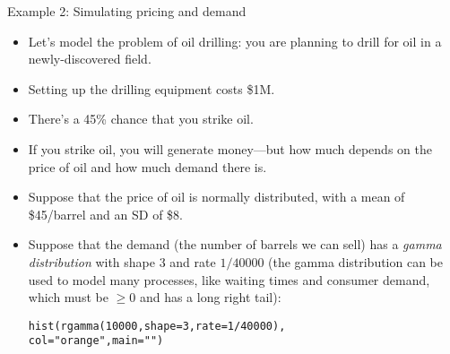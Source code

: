 \documentclass{beamer}\usepackage[]{graphicx}\usepackage[]{color}
\makeatletter
\newcommand{\hlnum}[1]{\textcolor[rgb]{0.824,0.412,0.118}{#1}}%
\newcommand{\hlstr}[1]{\textcolor[rgb]{1,0.894,0.71}{#1}}%
\newcommand{\hlopt}[1]{\textcolor[rgb]{1,0.894,0.769}{#1}}%
\newcommand{\hlstd}[1]{\textcolor[rgb]{1,0.894,0.769}{#1}}%
\newcommand{\hlkwc}[1]{\textcolor[rgb]{0.78,0.941,0.545}{#1}}%
\newcommand{\hlkwd}[1]{\textcolor[rgb]{1,0.78,0.769}{#1}}%
\newenvironment{kframe}{%
 \def\at@end@of@kframe{}%
 \ifinner\ifhmode%
  \def\at@end@of@kframe{\end{minipage}}%
  \begin{minipage}{\columnwidth}%
 \fi\fi%
 \def\FrameCommand##1{\hskip\@totalleftmargin \hskip-\fboxsep
 \colorbox{shadecolor}{##1}\hskip-\fboxsep
     \hskip-\linewidth \hskip-\@totalleftmargin \hskip\columnwidth}%
 \MakeFramed {\advance\hsize-\width
   \@totalleftmargin\z@ \linewidth\hsize
   \@setminipage}}%
 {\par\unskip\endMakeFramed%
 \at@end@of@kframe}
\newenvironment{knitrout}{}{} %
\makeatother
\begin{document}
\begin{darkframes}
    \begin{frame}{Example 2: Simulating pricing and demand}
      \begin{itemize}[<+->]
        \item Let's model the problem of oil drilling: you are planning to drill for oil in a newly-discovered field.
        \item Setting up the drilling equipment costs \$1M.
        \item There's a 45\% chance that you strike oil.
        \item If you strike oil, you will generate money---\pause but how much depends on the price of oil and how much demand there is.
      \end{itemize}
    \end{frame}

    \begin{frame}[fragile]
      \fontsm
      \begin{itemize}
        \item Suppose that the price of oil is normally distributed, with a mean of \$45/barrel and an SD of \$8.
        \item Suppose that the demand (the number of barrels we can sell) has a \emph{gamma distribution} with shape 3 and rate $1/40000$ (the gamma distribution can be used to model many processes, like waiting times and consumer demand, which must be $\geq 0$ and has a long right tail):
\begin{knitrout}
\begin{kframe}
\begin{alltt}
\hlkwd{hist}\hlstd{(}\hlkwd{rgamma}\hlstd{(}\hlnum{10000}\hlstd{,} \hlkwc{shape}\hlstd{=}\hlnum{3}\hlstd{,} \hlkwc{rate}\hlstd{=}\hlnum{1}\hlopt{/}\hlnum{40000}\hlstd{),}
  \hlkwc{col}\hlstd{=}\hlstr{"orange"}\hlstd{,} \hlkwc{main}\hlstd{=}\hlstr{""}\hlstd{)}
\end{alltt}
\end{kframe}


\end{knitrout}
      \end{itemize}

    \end{frame}


\end{darkframes}
\end{document}
